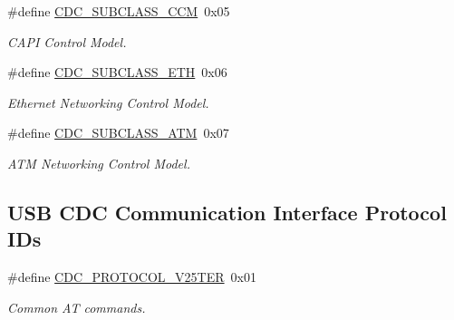\begin{DoxyCompactItemize}
\#define \hyperlink{group__cdc__protocol__group_gac03be4247341651b8a14fa4c57955bca}{C\+D\+C\+\_\+\+S\+U\+B\+C\+L\+A\+S\+S\+\_\+\+C\+CM}~0x05
\begin{DoxyCompactList}\small\item\em C\+A\+PI Control Model. \end{DoxyCompactList}\item 
\mbox{\label{group__cdc__protocol__group_gaa5ab06b184069e6a8692c6e82b2595b3}} 
\#define \hyperlink{group__cdc__protocol__group_gaa5ab06b184069e6a8692c6e82b2595b3}{C\+D\+C\+\_\+\+S\+U\+B\+C\+L\+A\+S\+S\+\_\+\+E\+TH}~0x06
\begin{DoxyCompactList}\small\item\em Ethernet Networking Control Model. \end{DoxyCompactList}\item 
\mbox{\label{group__cdc__protocol__group_gaf1a7d3d1e1dd78003500d6fccd205461}} 
\#define \hyperlink{group__cdc__protocol__group_gaf1a7d3d1e1dd78003500d6fccd205461}{C\+D\+C\+\_\+\+S\+U\+B\+C\+L\+A\+S\+S\+\_\+\+A\+TM}~0x07
\begin{DoxyCompactList}\small\item\em A\+TM Networking Control Model. \end{DoxyCompactList}\end{DoxyCompactItemize}
\subsection*{U\+SB C\+DC Communication Interface Protocol I\+Ds}
\begin{DoxyCompactItemize}
\item 
\mbox{\label{group__cdc__protocol__group_ga987e4a1ebce34edcea106094d6241032}} 
\#define \hyperlink{group__cdc__protocol__group_ga987e4a1ebce34edcea106094d6241032}{C\+D\+C\+\_\+\+P\+R\+O\+T\+O\+C\+O\+L\+\_\+\+V25\+T\+ER}~0x01
\begin{DoxyCompactList}\small\item\em Common AT commands. \end{DoxyCompactList}\end{DoxyCompactItemize}
